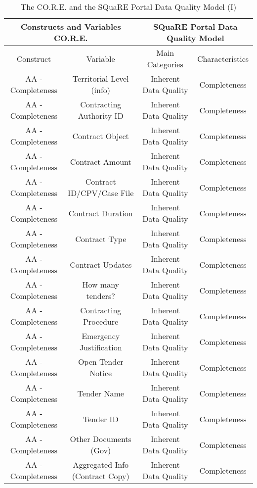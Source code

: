 \documentclass[a4paper, twoside]{report}
\begin{document}
\begin{table}[htbp]
  \centering
  \caption{The CO.R.E. and the SQuaRE Portal Data Quality Model (I)}
   \tabcolsep=0.60cm
	\renewcommand{\arraystretch}{1.8}
	\begin{adjustbox}{max width=\linewidth}
    \begin{tabular}{cc|cc}
    \hline
    \multicolumn{2}{c|}{Constructs and Variables CO.R.E.} & \multicolumn{2}{c}{SQuaRE Portal Data Quality Model} \\
    \hline
    Construct & Variable & Main Categories & Characteristics \\
    \hline
    AA - Completeness & Territorial Level (info) & Inherent Data Quality & Completeness \\
    AA - Completeness & Contracting Authority ID & Inherent Data Quality & Completeness \\
    AA - Completeness & Contract Object & Inherent Data Quality & Completeness \\
    AA - Completeness & Contract Amount & Inherent Data Quality & Completeness \\
    AA - Completeness & Contract ID/CPV/Case File & Inherent Data Quality & Completeness \\
    AA - Completeness & Contract Duration & Inherent Data Quality & Completeness \\
    AA - Completeness & Contract Type & Inherent Data Quality & Completeness \\
    AA - Completeness & Contract Updates & Inherent Data Quality & Completeness \\
    AA - Completeness & How many tenders? & Inherent Data Quality & Completeness \\
    \rowcolor[rgb]{ .851,  .851,  .851} AA - Completeness & Contracting Procedure & Inherent Data Quality & Completeness \\
    \rowcolor[rgb]{ .851,  .851,  .851} AA - Completeness & Emergency Justification & Inherent Data Quality & Completeness \\
    AA - Completeness & Open Tender Notice & Inherent Data Quality & Completeness \\
    AA - Completeness & Tender Name & Inherent Data Quality & Completeness \\
    AA - Completeness & Tender ID & Inherent Data Quality & Completeness \\
    AA - Completeness & Other Documents (Gov) & Inherent Data Quality & Completeness \\
    AA - Completeness & Aggregated Info (Contract Copy) & Inherent Data Quality & Completeness \\

\end{tabular}
\end{adjustbox}
\end{table}
\end{document}
